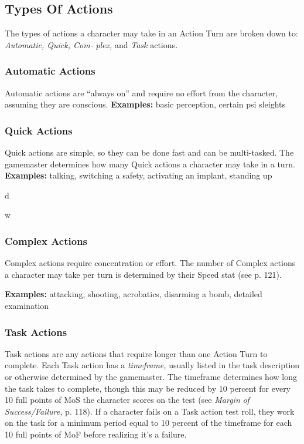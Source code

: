 \subsection{Types Of Actions}

The types of actions a character may take in an Action 
Turn are broken down to: \textit{Automatic, Quick, Com-}
\textit{plex, }and \textit{Task }actions\textit{.}

\subsubsection{Automatic Actions}

Automatic actions are ``always on'' and require no 
effort from the character, assuming they are conscious.
\textbf{Examples:} basic perception, certain psi sleights

\subsubsection{Quick Actions}

Quick actions are simple, so they can be done fast and 
can be multi-tasked. The gamemaster determines how 
many Quick actions a character may take in a turn.
\textbf{Examples:} talking, switching a safety, activating an 
implant, standing up

d

w

\subsubsection{Complex Actions}

Complex actions require concentration or 
effort. The number of Complex actions a 
character may take per turn is determined 
by their Speed stat (see p. 121).

\textbf{Examples:} attacking, shooting, acrobatics, 
disarming a bomb, detailed examination

\subsubsection{Task Actions}

Task actions are any actions that require 
longer than one Action Turn to complete. 
Each Task action has a \textit{timeframe,} usually 
listed in the task description or otherwise 
determined by the gamemaster. The timeframe
determines how long the task takes
to complete, though this may be reduced by 
10 percent for every 10 full points of MoS 
the character scores on the test (see \textit{Margin }
\textit{of Success/Failure,} p. 118). If a character 
fails on a Task action test roll, they work 
on the task for a minimum period equal to 
10 percent of the timeframe for each 10 full 
points of MoF before realizing it's a failure.

